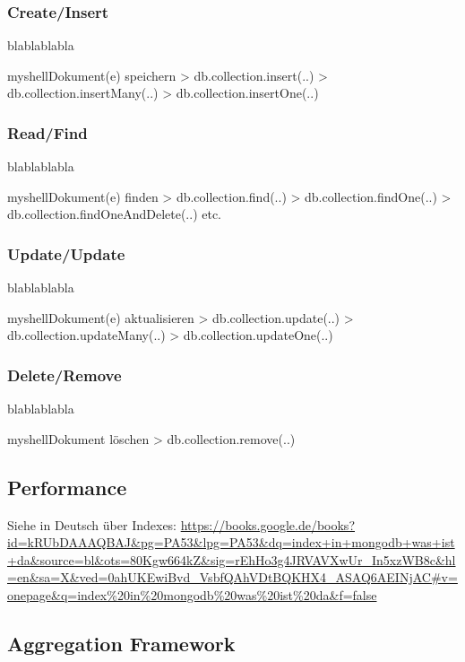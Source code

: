 \subsubsection{Create/Insert}
blablablabla
\begin{listingsboxShell}[label={lst:insert}]{myshell}{Dokument(e) speichern}
> db.collection.insert(..)
> db.collection.insertMany(..)
> db.collection.insertOne(..)
\end{listingsboxShell}
\subsubsection{Read/Find}
blablablabla
\begin{listingsboxShell}[label={lst:find}]{myshell}{Dokument(e) finden}
> db.collection.find(..)
> db.collection.findOne(..)
> db.collection.findOneAndDelete(..)
etc.
\end{listingsboxShell}
\subsubsection{Update/Update}
blablablabla
\begin{listingsboxShell}[label={lst:update}]{myshell}{Dokument(e) aktualisieren}
> db.collection.update(..)
> db.collection.updateMany(..)
> db.collection.updateOne(..)
\end{listingsboxShell}
\subsubsection{Delete/Remove}
blablablabla
\begin{listingsboxShell}[label={lst:remove}]{myshell}{Dokument löschen}
> db.collection.remove(..)
\end{listingsboxShell}
\subsection{Performance}
Siehe in Deutsch über Indexes: \url{https://books.google.de/books?id=kRUbDAAAQBAJ&pg=PA53&lpg=PA53&dq=index+in+mongodb+was+ist+da&source=bl&ots=80Kgw664kZ&sig=rEhHo3g4JRVAVXwUr_In5xzWB8c&hl=en&sa=X&ved=0ahUKEwiBvd_VsbfQAhVDtBQKHX4_ASAQ6AEINjAC#v=onepage&q=index%20in%20mongodb%20was%20ist%20da&f=false}\newline

\subsection{Aggregation Framework}\label{aggr}

